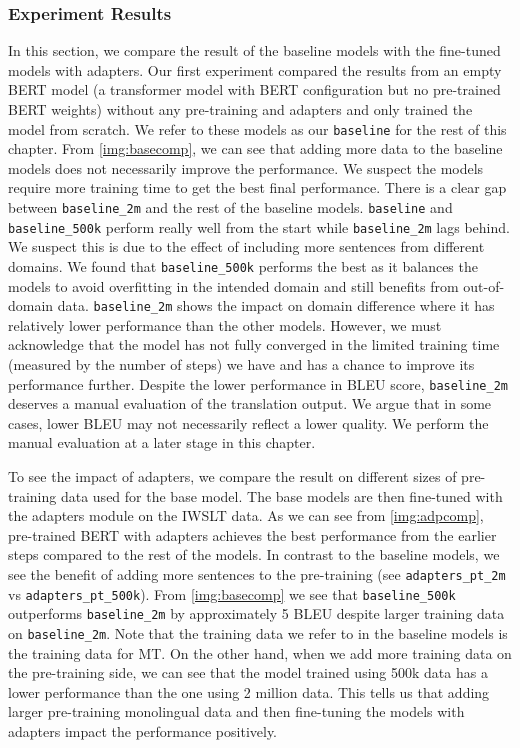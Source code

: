 \subsubsection{Experiment Results}

In this section, we compare the result of the baseline models with the fine-tuned models with adapters. Our first experiment compared the results from an empty BERT model (a transformer model with BERT configuration but no pre-trained BERT weights) without any pre-training and adapters and only trained the model from scratch. We refer to these models as our \texttt{baseline} for the rest of this chapter. From \cref{img:basecomp}, we can see that adding more data to the baseline models does not necessarily improve the performance. We suspect the models require more training time to get the best final performance. There is a clear gap between \texttt{baseline\_2m} and the rest of the baseline models. \texttt{baseline} and \texttt{baseline\_500k} perform really well from the start while \texttt{baseline\_2m} lags behind. We suspect this is due to the effect of including more sentences from different domains. We found that \texttt{baseline\_500k} performs the best as it balances the models to avoid overfitting in the intended domain and still benefits from out-of-domain data. \texttt{baseline\_2m} shows the impact on domain difference where it has relatively lower performance than the other models. However, we must acknowledge that the model has not fully converged in the limited training time (measured by the number of steps) we have and has a chance to improve its performance further. Despite the lower performance in BLEU score, \texttt{baseline\_2m} deserves a manual evaluation of the translation output. We argue that in some cases, lower BLEU may not necessarily reflect a lower quality. We perform the manual evaluation at a later stage in this chapter.

To see the impact of adapters, we compare the result on different sizes of pre-training data used for the base model. The base models are then fine-tuned with the adapters module on the IWSLT data. As we can see from \cref{img:adpcomp}, pre-trained BERT with adapters achieves the best performance from the earlier steps compared to the rest of the models. In contrast to the baseline models, we see the benefit of adding more sentences to the pre-training (see \texttt{adapters\_pt\_2m} vs \texttt{adapters\_pt\_500k}). From \cref{img:basecomp} we see that \texttt{baseline\_500k} outperforms \texttt{baseline\_2m} by approximately 5 BLEU despite larger training data on \texttt{baseline\_2m}. Note that the training data we refer to in the baseline models is the training data for MT. On the other hand, when we add more training data on the pre-training side, we can see that the model trained using 500k data has a lower performance than the one using 2 million data. This tells us that adding larger pre-training monolingual data and then fine-tuning the models with adapters impact the performance positively.

